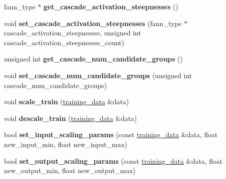 \begin{DoxyCompactItemize}
\item 
\hypertarget{class_f_a_n_n_1_1neural__net_ac9dcb36436c026df46f8dfebd20bccdf}{fann\-\_\-type $\ast$ {\bfseries get\-\_\-cascade\-\_\-activation\-\_\-steepnesses} ()}\label{class_f_a_n_n_1_1neural__net_ac9dcb36436c026df46f8dfebd20bccdf}

\item 
\hypertarget{class_f_a_n_n_1_1neural__net_a2ea7981e62b3dfb1e26e15d0bb98c274}{void {\bfseries set\-\_\-cascade\-\_\-activation\-\_\-steepnesses} (fann\-\_\-type $\ast$cascade\-\_\-activation\-\_\-steepnesses, unsigned int cascade\-\_\-activation\-\_\-steepnesses\-\_\-count)}\label{class_f_a_n_n_1_1neural__net_a2ea7981e62b3dfb1e26e15d0bb98c274}

\item 
\hypertarget{class_f_a_n_n_1_1neural__net_ae613c6405abe7a17a0e6c366389af963}{unsigned int {\bfseries get\-\_\-cascade\-\_\-num\-\_\-candidate\-\_\-groups} ()}\label{class_f_a_n_n_1_1neural__net_ae613c6405abe7a17a0e6c366389af963}

\item 
\hypertarget{class_f_a_n_n_1_1neural__net_afa05bba1a0fa54c6311abcff38b59b47}{void {\bfseries set\-\_\-cascade\-\_\-num\-\_\-candidate\-\_\-groups} (unsigned int cascade\-\_\-num\-\_\-candidate\-\_\-groups)}\label{class_f_a_n_n_1_1neural__net_afa05bba1a0fa54c6311abcff38b59b47}

\item 
\hypertarget{class_f_a_n_n_1_1neural__net_ad95c6a2396bfca111636a3326ed18660}{void {\bfseries scale\-\_\-train} (\hyperlink{class_f_a_n_n_1_1training__data}{training\-\_\-data} \&data)}\label{class_f_a_n_n_1_1neural__net_ad95c6a2396bfca111636a3326ed18660}

\item 
\hypertarget{class_f_a_n_n_1_1neural__net_a23b64232f441a4b965720d848cc94f57}{void {\bfseries descale\-\_\-train} (\hyperlink{class_f_a_n_n_1_1training__data}{training\-\_\-data} \&data)}\label{class_f_a_n_n_1_1neural__net_a23b64232f441a4b965720d848cc94f57}

\item 
\hypertarget{class_f_a_n_n_1_1neural__net_a423c16c25970d52036c0fddf8755a7e9}{bool {\bfseries set\-\_\-input\-\_\-scaling\-\_\-params} (const \hyperlink{class_f_a_n_n_1_1training__data}{training\-\_\-data} \&data, float new\-\_\-input\-\_\-min, float new\-\_\-input\-\_\-max)}\label{class_f_a_n_n_1_1neural__net_a423c16c25970d52036c0fddf8755a7e9}

\item 
\hypertarget{class_f_a_n_n_1_1neural__net_a44b37d1697e57dfa61ded35bbba1d099}{bool {\bfseries set\-\_\-output\-\_\-scaling\-\_\-params} (const \hyperlink{class_f_a_n_n_1_1training__data}{training\-\_\-data} \&data, float new\-\_\-output\-\_\-min, float new\-\_\-output\-\_\-max)}\label{class_f_a_n_n_1_1neural__net_a44b37d1697e57dfa61ded35bbba1d099}


\end{DoxyCompactItemize}
